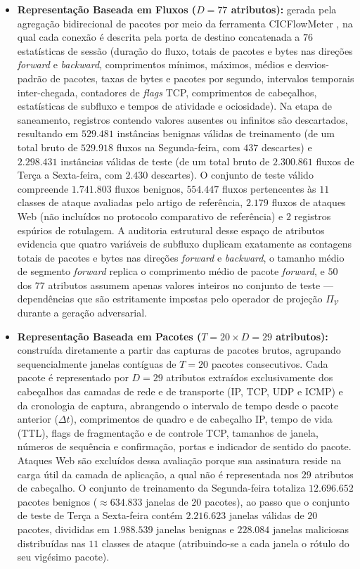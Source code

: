 \documentclass[conference]{IEEEtran}
\begin{document}
\begin{itemize}
    \item \textbf{Representação Baseada em Fluxos ($D = 77$ atributos):} gerada pela agregação bidirecional de pacotes por meio da ferramenta CICFlowMeter \cite{sharafaldin2018}, na qual cada conexão é descrita pela porta de destino concatenada a $76$ estatísticas de sessão (duração do fluxo, totais de pacotes e bytes nas direções \textit{forward} e \textit{backward}, comprimentos mínimos, máximos, médios e desvios-padrão de pacotes, taxas de bytes e pacotes por segundo, intervalos temporais inter-chegada, contadores de \textit{flags} TCP, comprimentos de cabeçalhos, estatísticas de subfluxo e tempos de atividade e ociosidade).
    Na etapa de saneamento, registros contendo valores ausentes ou infinitos são descartados, resultando em $529.481$ instâncias benignas válidas de treinamento (de um total bruto de $529.918$ fluxos na Segunda-feira, com $437$ descartes) e $2.298.431$ instâncias válidas de teste (de um total bruto de $2.300.861$ fluxos de Terça a Sexta-feira, com $2.430$ descartes).
    O conjunto de teste válido compreende $1.741.803$ fluxos benignos, $554.447$ fluxos pertencentes às $11$ classes de ataque avaliadas pelo artigo de referência, $2.179$ fluxos de ataques Web (não incluídos no protocolo comparativo de referência) e $2$ registros espúrios de rotulagem.
    A auditoria estrutural desse espaço de atributos evidencia que quatro variáveis de subfluxo duplicam exatamente as contagens totais de pacotes e bytes nas direções \textit{forward} e \textit{backward}, o tamanho médio de segmento \textit{forward} replica o comprimento médio de pacote \textit{forward}, e $50$ dos $77$ atributos assumem apenas valores inteiros no conjunto de teste — dependências que são estritamente impostas pelo operador de projeção $\Pi_{\mathcal{V}}$ durante a geração adversarial.
    \item \textbf{Representação Baseada em Pacotes ($T = 20 \times D = 29$ atributos):} construída diretamente a partir das capturas de pacotes brutos, agrupando sequencialmente janelas contíguas de $T = 20$ pacotes consecutivos.
    Cada pacote é representado por $D = 29$ atributos extraídos exclusivamente dos cabeçalhos das camadas de rede e de transporte (IP, TCP, UDP e ICMP) e da cronologia de captura, abrangendo o intervalo de tempo desde o pacote anterior ($\Delta t$), comprimentos de quadro e de cabeçalho IP, tempo de vida (TTL), flags de fragmentação e de controle TCP, tamanhos de janela, números de sequência e confirmação, portas e indicador de sentido do pacote.
    Ataques Web são excluídos dessa avaliação porque sua assinatura reside na carga útil da camada de aplicação, a qual não é representada nos $29$ atributos de cabeçalho.
    O conjunto de treinamento da Segunda-feira totaliza $12.696.652$ pacotes benignos ($\approx 634.833$ janelas de $20$ pacotes), ao passo que o conjunto de teste de Terça a Sexta-feira contém $2.216.623$ janelas válidas de $20$ pacotes, divididas em $1.988.539$ janelas benignas e $228.084$ janelas maliciosas distribuídas nas $11$ classes de ataque (atribuindo-se a cada janela o rótulo do seu vigésimo pacote).
\end{itemize}
\end{document}
